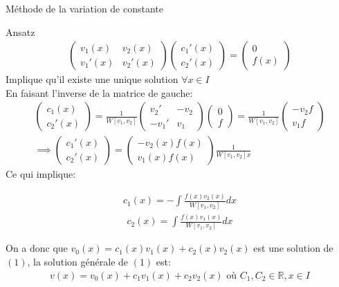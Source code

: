 \begin{parag}{Méthode de la variation de constante}
\begin{subparag}{Ansatz}
       \begin{align*}
           \begin{pmatrix}
               v_1(x) &v_2(x)  \\
               v_1'(x) & v_2'(x)
           \end{pmatrix} \begin{pmatrix}
               c_1'(x)\\ c_2'(x)
           \end{pmatrix} = \begin{pmatrix}
               0\\ f(x)
           \end{pmatrix}
       \end{align*}
      Implique qu'il existe une unique solution $ \forall x \in I$
       \\
       En faisant l'inverse de la matrice de gauche:
       \begin{align*}
           \begin{pmatrix}
               c_1(x) \\ c_2'(x)
           \end{pmatrix} = \frac{1}{W[v_1, v_2]} \begin{pmatrix}
               v_2' &-v_2  \\
               -v_1' & v_1
           \end{pmatrix} \begin{pmatrix}
               0\\ f
           \end{pmatrix} = \frac{1}{W[v_1, v_2]} \begin{pmatrix}
               -v_2f \\ v_1f
           \end{pmatrix}\\
           \implies \begin{pmatrix}
               c_1'(x)\\ c_2'(x)
           \end{pmatrix} = \begin{pmatrix}
               -v_2(x)f(x)\\ v_1(x)f(x)
           \end{pmatrix} \frac{1}{W[v_1, v_2]x}
       \end{align*}
       Ce qui implique:
       \begin{formule}
           \begin{align*}
               c_1(x) = - \int \frac{f(x)v_2(x)}{W[v_1, v_2]}dx
           \end{align*}
           \begin{align*}
               c_2(x) = \int \frac{f(x)v_1(x)}{W[v_1, v_2]}dx
           \end{align*}
       \end{formule}
       On a donc que $v_0(x) = c_1(x)v_1(x) + c_2(x)v_2(x)$ est une solution de $(1)$, la solution générale de $(1)$ est:
       \begin{align*}
           v(x) = v_0(x) + c_1v_1(x) + c_2v_2(x) \text{ où } C_1, C_2 \in \mathbb{R}, x \in I
       \end{align*}
       

\end{subparag}
\end{parag}
